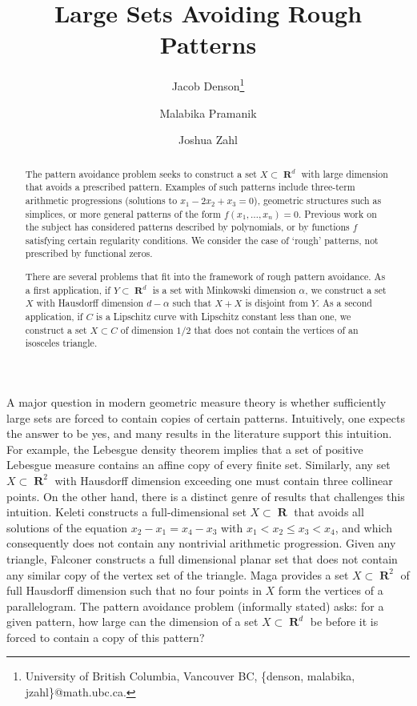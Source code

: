 \documentclass[dvipsnames,letterpaper,12pt]{article}
\title{Large Sets Avoiding Rough Patterns}
\author{Jacob Denson\thanks{University of British Columbia, Vancouver BC, \{denson, malabika, jzahl\}@math.ubc.ca.} \and Malabika Pramanik\footnotemark[1] \and Joshua Zahl\footnotemark[1]}
\numberwithin{equation}{section}
\theoremstyle{plain}
\theoremstyle{remark}
\DeclareMathOperator{\RR}{\mathbf{R}}
\begin{document}
\maketitle

\begin{abstract}
	The pattern avoidance problem seeks to construct a set $X\subset \RR^d$ with large dimension that avoids a prescribed pattern. Examples of such patterns include three-term arithmetic progressions (solutions to $x_1 - 2x_2 + x_3 = 0$), geometric structures such as simplices, or more general patterns of the form $f(x_1, \dots, x_n) = 0$. Previous work on the subject has considered patterns described by polynomials, or by functions $f$ satisfying certain regularity conditions. We consider the case of `rough' patterns, not prescribed by functional zeros.

	There are several problems that fit into the framework of rough pattern avoidance. As a first application, if $Y \subset \RR^d$ is a set with Minkowski dimension $\alpha$, we construct a set $X$ with Hausdorff dimension $d-\alpha$ such that $X+X$ is disjoint from $Y$. As a second application, if $C$ is a Lipschitz curve with Lipschitz constant less than one, we construct a set $X \subset C$ of dimension $1/2$ that does not contain the vertices of an isosceles triangle.
\end{abstract}



A major question in modern geometric measure theory is whether sufficiently large sets are forced to contain copies of certain patterns. Intuitively, one expects the answer to be yes, and many results in the literature support this intuition. For example, the Lebesgue density theorem implies that a set of positive Lebesgue measure contains an affine copy of every finite set. Similarly, any set $X \subset \RR^2$ with Hausdorff dimension exceeding one must contain three collinear points. On the other hand, there is a distinct genre of results that challenges this intuition. Keleti \cite{KeletiDimOneSet} constructs a full-dimensional set $X \subset \RR$ that avoids all solutions of the equation $x_2 - x_1 = x_4 - x_3$ with $x_1 < x_2 \leq x_3 < x_4$, and which consequently does not contain any nontrivial arithmetic progression. Given any triangle, Falconer \cite{FalconerPaper} constructs a full dimensional planar set that does not contain any similar copy of the vertex set of the triangle. Maga \cite{Maga} provides a set $X \subset \RR^2$ of full Hausdorff dimension such that no four points in $X$ form the vertices of a parallelogram. The pattern avoidance problem (informally stated) asks: for a given pattern, how large can the dimension of a set $X \subset \RR^d$ be before it is forced to contain a copy of this pattern? 
\end{document}
